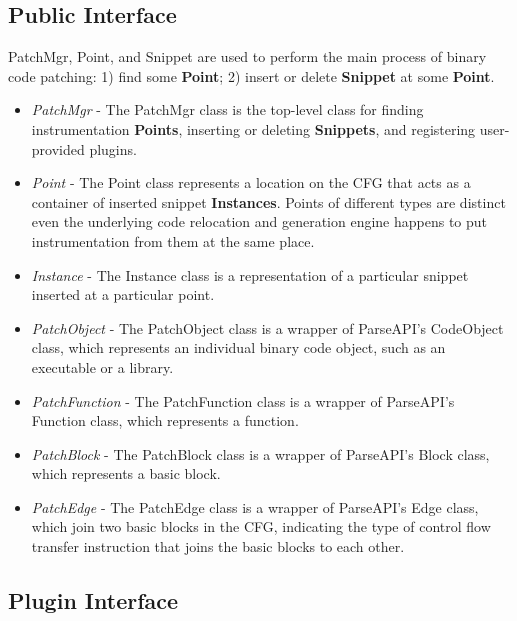 \subsection{Public Interface}
\label{sec-2.1}

PatchMgr, Point, and Snippet are used to perform the main process of binary code
patching: 1) find some \textbf{Point}; 2) insert or delete \textbf{Snippet} at some \textbf{Point}.
\begin{itemize}
\item \emph{PatchMgr} - The PatchMgr class is the top-level class for finding
    instrumentation \textbf{Points}, inserting or deleting \textbf{Snippets}, and registering
    user-provided plugins.
\item \emph{Point} - The Point class represents a location on the CFG that acts as a
    container of inserted snippet \textbf{Instances}. Points of different types are
    distinct even the underlying code relocation and generation engine happens
    to put instrumentation from them at the same place.
\item \emph{Instance} - The Instance class is a representation of a particular snippet
    inserted at a particular point.
\item \emph{PatchObject} - The PatchObject class is a wrapper of ParseAPI's CodeObject
    class, which represents an individual binary code object, such as an
    executable or a library.
\item \emph{PatchFunction} - The PatchFunction class is a wrapper of ParseAPI's
    Function class, which represents a function.
\item \emph{PatchBlock} - The PatchBlock class is a wrapper of ParseAPI's Block class,
    which represents a basic block.
\item \emph{PatchEdge} - The PatchEdge class is a wrapper of ParseAPI's Edge class,
    which join two basic blocks in the CFG, indicating the type of control flow
    transfer instruction that joins the basic blocks to each other.
\end{itemize}
\subsection{Plugin Interface}
\label{sec-2.2}

